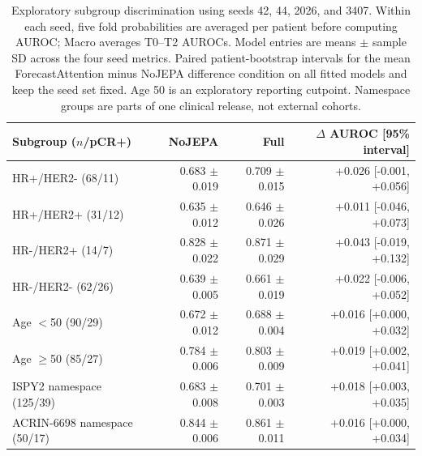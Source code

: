 \begin{table}[t]
\centering
\small
\caption{Exploratory subgroup discrimination using seeds 42, 44, 2026, and 3407. Within each seed, five fold probabilities are averaged per patient before computing AUROC; Macro averages T0--T2 AUROCs. Model entries are means $\pm$ sample SD across the four seed metrics. Paired patient-bootstrap intervals for the mean ForecastAttention minus NoJEPA difference condition on all fitted models and keep the seed set fixed. Age 50 is an exploratory reporting cutpoint. Namespace groups are parts of one clinical release, not external cohorts.}
\label{tab:subgroups}
\begin{tabular}{lrrr}
\toprule
Subgroup ($n$/pCR+) & NoJEPA & Full & $\Delta$ AUROC [95\% interval] \\
\midrule
HR+/HER2- (68/11) & 0.683 $\pm$ 0.019 & 0.709 $\pm$ 0.015 & +0.026 [-0.001, +0.056] \\
HR+/HER2+ (31/12) & 0.635 $\pm$ 0.012 & 0.646 $\pm$ 0.026 & +0.011 [-0.046, +0.073] \\
HR-/HER2+ (14/7) & 0.828 $\pm$ 0.022 & 0.871 $\pm$ 0.029 & +0.043 [-0.019, +0.132] \\
HR-/HER2- (62/26) & 0.639 $\pm$ 0.005 & 0.661 $\pm$ 0.019 & +0.022 [-0.006, +0.052] \\
Age $<$50 (90/29) & 0.672 $\pm$ 0.012 & 0.688 $\pm$ 0.004 & +0.016 [+0.000, +0.032] \\
Age $\geq$50 (85/27) & 0.784 $\pm$ 0.006 & 0.803 $\pm$ 0.009 & +0.019 [+0.002, +0.041] \\
ISPY2 namespace (125/39) & 0.683 $\pm$ 0.008 & 0.701 $\pm$ 0.003 & +0.018 [+0.003, +0.035] \\
ACRIN-6698 namespace (50/17) & 0.844 $\pm$ 0.006 & 0.861 $\pm$ 0.011 & +0.016 [+0.000, +0.034] \\
\bottomrule
\end{tabular}
\end{table}
